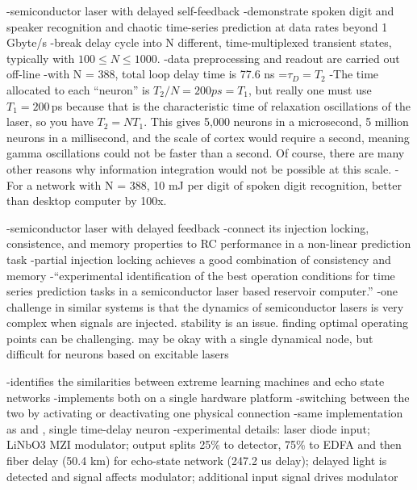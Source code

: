 \vspace{3em}
\cite{brso2013}
-semiconductor laser with delayed self-feedback
-demonstrate spoken digit and speaker recognition and chaotic time-series prediction at data rates beyond 1 Gbyte/s
-break delay cycle into N different, time-multiplexed transient states, typically with $100\le N \le 1000$.
-data preprocessing and readout are carried out off-line
-with N = 388, total loop delay time is 77.6 ns =$\tau_D = T_2$
-The time allocated to each ``neuron'' is $T_2/N = 200ps = T_1$, but really one must use $T_1 = 200$\,ps because that is the characteristic time of relaxation oscillations of the laser, so you have $T_2 = NT_1$. This gives 5,000 neurons in a microsecond, 5 million neurons in a millisecond, and the scale of cortex would require a second, meaning gamma oscillations could not be faster than a second. Of course, there are many other reasons why information integration would not be possible at this scale.
-For a network with N = 388, 10 mJ per digit of spoken digit recognition, better than desktop computer by 100x.


\vspace{3em}
\cite{cosc2018} 

\vspace{3em}
\cite{rofi2017}

\vspace{3em}
\cite{bubr2017}
-semiconductor laser with delayed feedback
-connect its injection locking, consistence, and memory properties to RC performance in a non-linear prediction task
-partial injection locking achieves a good combination of consistency and memory
-``experimental identification of the best operation conditions for time series prediction tasks in a semiconductor laser based reservoir computer.''
-one challenge in similar systems is that the dynamics of semiconductor lasers is very complex when signals are injected. stability is an issue. finding optimal operating points can be challenging. may be okay with a single dynamical node, but difficult for neurons based on excitable lasers

\vspace{3em}
\cite{orso2015}
-identifies the similarities between extreme learning machines and echo state networks
-implements both on a single hardware platform
-switching between the two by activating or deactivating one physical connection
-same implementation as \cite{padu2012} and \cite{laso2012}, single time-delay neuron
-experimental details: laser diode input; LiNbO3 MZI modulator; output splits 25\% to detector, 75\% to EDFA and then fiber delay (50.4 km) for echo-state network (247.2 us delay); delayed light is detected and signal affects modulator; additional input signal drives modulator

